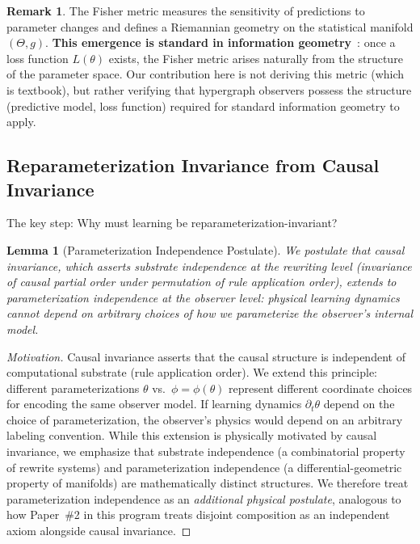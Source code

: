 \documentclass[11pt,a4paper]{article}
\theoremstyle{plain}
\newtheorem{lemma}[theorem]{Lemma}
\theoremstyle{definition}
\newtheorem{remark}[theorem]{Remark}
\theoremstyle{remark}
\begin{document}
\begin{remark}
The Fisher metric measures the sensitivity of predictions to parameter changes and defines a Riemannian geometry on the statistical manifold $(\Theta, g)$. \textbf{This emergence is standard in information geometry}~\cite{amari1998natural}: once a loss function $L(\theta)$ exists, the Fisher metric arises naturally from the structure of the parameter space. Our contribution here is not deriving this metric (which is textbook), but rather verifying that hypergraph observers possess the structure (predictive model, loss function) required for standard information geometry to apply.
\end{remark}

\subsection{Reparameterization Invariance from Causal Invariance}

The key step: Why must learning be reparameterization-invariant?

\begin{lemma}[Parameterization Independence Postulate]
\label{lem:substrate_indep}
We postulate that causal invariance, which asserts substrate independence at the rewriting level (invariance of causal partial order under permutation of rule application order), extends to parameterization independence at the observer level: physical learning dynamics cannot depend on arbitrary choices of how we parameterize the observer's internal model.
\end{lemma}
\begin{proof}[Motivation]
Causal invariance asserts that the causal structure is independent of computational substrate (rule application order). We extend this principle: different parameterizations $\theta$ vs.\ $\phi = \phi(\theta)$ represent different coordinate choices for encoding the same observer model. If learning dynamics $\partial_t \theta$ depend on the choice of parameterization, the observer's physics would depend on an arbitrary labeling convention. While this extension is physically motivated by causal invariance, we emphasize that substrate independence (a combinatorial property of rewrite systems) and parameterization independence (a differential-geometric property of manifolds) are mathematically distinct structures. We therefore treat parameterization independence as an \emph{additional physical postulate}, analogous to how Paper~\#2 in this program treats disjoint composition as an independent axiom alongside causal invariance.
\end{proof}
\end{document}

